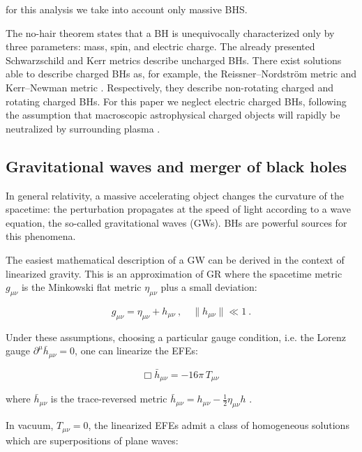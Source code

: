 \noindent
for this analysis we take into account only massive BHS.

The no-hair theorem states \cite{Tang_2022} that a BH is unequivocally characterized only by three parameters: mass, spin, and electric charge. The already presented  Schwarzschild and Kerr metrics describe uncharged BHs. There exist solutions able to describe charged BHs as, for example, the Reissner–Nordström metric \cite{1916AnP...355..106R} and Kerr–Newman metric \cite{adamo2016kerrnewman}. Respectively, they describe  non-rotating charged and rotating charged BHs. For this paper we neglect electric charged BHs, following the assumption that macroscopic astrophysical charged objects will rapidly be neutralized by surrounding plasma \cite{Teukolsky_2015}.


\subsection{Gravitational waves and merger of black holes}


In general relativity, a massive accelerating object changes the curvature of the spacetime: the perturbation propagates at the speed of light according to a wave equation, the so-called gravitational waves (GWs). BHs are powerful sources for this phenomena. 

The easiest mathematical description of a GW can be derived in the context of linearized gravity. This is an approximation of GR where the spacetime metric $ g_{\mu\nu} $ is the Minkowski flat metric $ \eta_{\mu\nu} $ plus a small deviation: 

\begin{equation}
g_{\mu\nu}=\eta_{\mu\nu} + h_{\mu\nu} \:, \quad \parallel h_{\mu\nu} \parallel \ll 1 \: .
\end{equation}

Under these assumptions, choosing a particular gauge condition, i.e. the Lorenz gauge  $\partial^\mu \bar{h}_{\mu\nu} = 0 $, one can linearize the EFEs:

\begin{equation}
 \Box \bar{h}_{\mu\nu} = -16\pi \, T_{\mu\nu}  \: 
\end{equation}

\noindent
where $ \bar{h}_{\mu\nu}$ is the  trace-reversed metric $ \bar{h}_{\mu\nu} = h_{\mu\nu} - \frac{1}{2} \eta_{\mu\nu} h $  \cite{Flanagan_2005}. 

In vacuum, $ T_{\mu\nu} = 0 $, the linearized EFEs admit a class of homogeneous solutions which are superpositions of plane waves:

